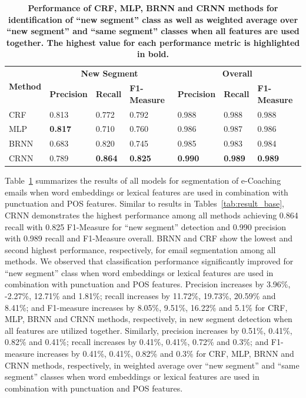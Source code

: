 \documentclass{amia}
\begin{document}
\begin{table}[ht]
\centering
\caption{\textbf{Performance of CRF, MLP, BRNN and CRNN methods for identification of ``new segment'' class as well as weighted average over ``new segment'' and ``same segment'' classes when all features are used together. The highest value for each performance metric
is highlighted in bold.}}
\label{tab:result_weighted_avg}
 \begin{tabular}{|l|l|l|l|l|l|l|}
  \hline
   \multirow{2}{*}{\textbf{Method}} & \multicolumn{3}{|c|}{\textbf{New Segment}} & \multicolumn{3}{|c|}{\textbf{Overall}} \\\cline{2-7}
   & \textbf{Precision}  & \textbf{Recall} & \textbf{F1-Measure} & \textbf{Precision}  & \textbf{Recall} & \textbf{F1-Measure} \\ \hline    
 CRF & 0.813 & 0.772 & 0.792 & 0.988 & 0.988 & 0.988 \\ \hline
 MLP & \textbf{0.817} & 0.710 & 0.760 & 0.986 & 0.987 & 0.986 \\ \hline
 BRNN & 0.683 & 0.820 & 0.745 & 0.985 & 0.983 & 0.984 \\ \hline
 CRNN & 0.789 & \textbf{0.864} & \textbf{0.825} & \textbf{0.990} & \textbf{0.989} & \textbf{0.989} \\ \hline
  \end{tabular}
\end{table}       

Table~\ref{tab:result_weighted_avg} summarizes the results of all models for segmentation of e-Coaching emails when word embeddings or lexical features are used in combination with punctuation and POS features. Similar to results in Tables~\ref{tab:result_base}, CRNN demonstrates the highest performance among all methods achieving 0.864 recall with 0.825 F1-Measure for ``new segment'' detection and 0.990 precision with 0.989 recall and F1-Measure overall. BRNN and CRF show the lowest and second highest performance, respectively, for email segmentation among all methods. We observed that classification performance significantly improved for ``new segment'' class when word embeddings or lexical features are used in combination with punctuation and POS features. Precision increases by 3.96\%, -2.27\%, 12.71\% and 1.81\%; recall increases by 11.72\%, 19.73\%, 20.59\% and 8.41\%; and F1-measure increases by 8.05\%, 9.51\%, 16.22\% and 5.1\% for CRF, MLP, BRNN and CRNN methods, respectively, in new segment detection when all features are utilized together. Similarly, precision increases by 0.51\%, 0.41\%, 0.82\% and 0.41\%; recall increases by 0.41\%, 0.41\%, 0.72\% and 0.3\%; and F1-measure increases by 0.41\%, 0.41\%, 0.82\% and 0.3\% for CRF, MLP, BRNN and CRNN methods, respectively, in weighted average over ``new segment'' and ``same segment'' classes when word embeddings or lexical features are used in combination with punctuation and POS features.\\
\end{document}
